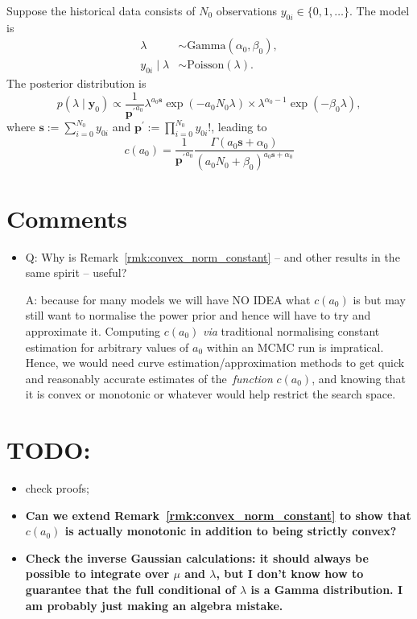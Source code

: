 \documentclass[a4paper, notitlepage, 11pt]{article}
\begin{document}
Suppose the historical data consists of $N_0$ observations $y_{0i} \in \{0, 1, \ldots \}$.
The model is 
\begin{align*}
 \lambda &\sim \text{Gamma}(\alpha_0, \beta_0),\\
 y_{0i} \mid \lambda &\sim \text{Poisson}(\lambda).
\end{align*}
The posterior distribution is 
\begin{equation}
 p(\lambda \mid \boldsymbol y_0) \propto \frac{1}{\boldsymbol {p^\prime}^{a_0} } \lambda^{a_0\boldsymbol s} \exp(-a_0 N_0 \lambda) \times \lambda^{\alpha_0-1} \exp(-\beta_0\lambda),
\end{equation}
where $\boldsymbol s := \sum_{i=0}^{N_0} y_{0i}$ and $\boldsymbol p^\prime := \prod_{i = 0}^{N_0} y_{0i}!$, leading to
\begin{equation}
 \label{eq:cA0_poisson}
 c(a_0) = \frac{1}{\boldsymbol {p^\prime}^{a_0} } \frac{\Gamma(a_0\boldsymbol s + \alpha_0)}{\left( a_0N_0 + \beta_0 \right)^{a_0\boldsymbol s + \alpha_0} }
\end{equation}

\section*{Comments}
\begin{itemize}
 \item  Q: Why is Remark~\ref{rmk:convex_norm_constant} -- and other results in the same spirit -- useful? 
 
 A: because for many models we will have NO IDEA what $c(a_0)$ is but may still want to normalise the power prior and hence will have to try and approximate it. 
 Computing $c(a_0)$ \textit{via} traditional normalising constant estimation for arbitrary values of $a_0$ within an MCMC run is impratical.
 Hence, we would need curve estimation/approximation methods to get quick and reasonably accurate estimates of the~\textit{function} $c(a_0)$, and knowing that it is convex or monotonic or whatever would help restrict the search space.
\end{itemize}

\section*{TODO:}
\begin{itemize}
 \item check proofs;
 \item \textbf{Can we extend Remark~\ref{rmk:convex_norm_constant} to show that $c(a_0)$ is actually monotonic in addition to being strictly convex?}
 \item \textbf{Check the inverse Gaussian calculations: it should always be possible to integrate over $\mu$ and $\lambda$, but I don't know how to guarantee that the full conditional of $\lambda$ is a Gamma distribution. 
 I am probably just making an algebra mistake.}
\end{itemize}
\end{document}
